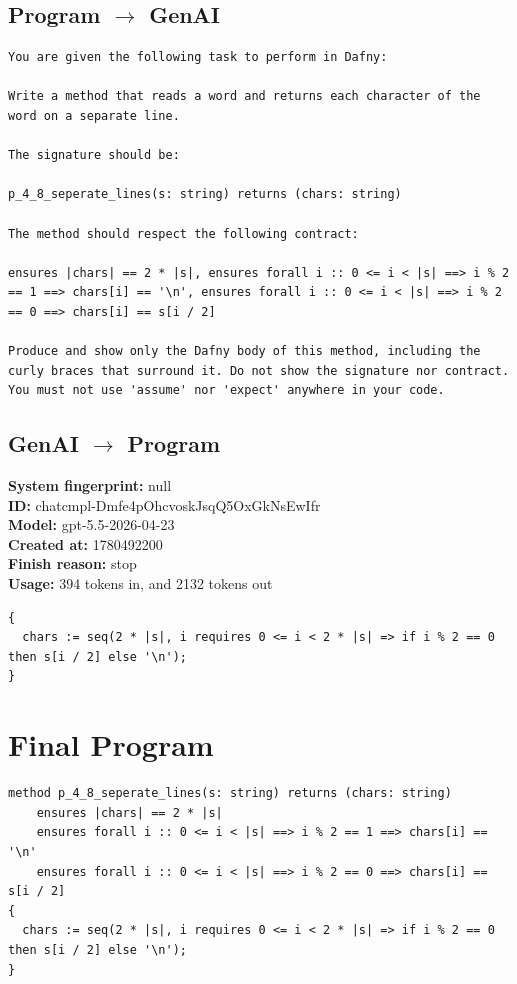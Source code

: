 \documentclass{article}
\begin{document}
\subsection*{Program $\rightarrow$ GenAI}
\begin{lstlisting}
You are given the following task to perform in Dafny:

Write a method that reads a word and returns each character of the word on a separate line.

The signature should be:

p_4_8_seperate_lines(s: string) returns (chars: string)

The method should respect the following contract:

ensures |chars| == 2 * |s|, ensures forall i :: 0 <= i < |s| ==> i % 2 == 1 ==> chars[i] == '\n', ensures forall i :: 0 <= i < |s| ==> i % 2 == 0 ==> chars[i] == s[i / 2]

Produce and show only the Dafny body of this method, including the curly braces that surround it. Do not show the signature nor contract. You must not use 'assume' nor 'expect' anywhere in your code.
\end{lstlisting}
\subsection*{GenAI $\rightarrow$ Program}
\textbf{System fingerprint: }null
\\\textbf{ID: }chatcmpl-Dmfe4pOhcvoskJsqQ5OxGkNsEwIfr
\\\textbf{Model: }gpt-5.5-2026-04-23
\\\textbf{Created at: }1780492200
\\\textbf{Finish reason: }stop
\\\textbf{Usage: }394 tokens in, and 2132 tokens out
\begin{lstlisting}
{
  chars := seq(2 * |s|, i requires 0 <= i < 2 * |s| => if i % 2 == 0 then s[i / 2] else '\n');
}
\end{lstlisting}
\section*{Final Program}
\begin{lstlisting}
method p_4_8_seperate_lines(s: string) returns (chars: string)
	ensures |chars| == 2 * |s|
	ensures forall i :: 0 <= i < |s| ==> i % 2 == 1 ==> chars[i] == '\n'
	ensures forall i :: 0 <= i < |s| ==> i % 2 == 0 ==> chars[i] == s[i / 2]
{
  chars := seq(2 * |s|, i requires 0 <= i < 2 * |s| => if i % 2 == 0 then s[i / 2] else '\n');
}
\end{lstlisting}
\end{document}
